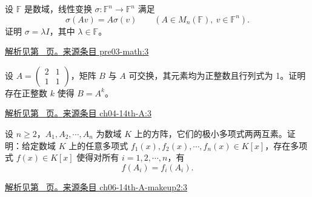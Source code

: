 \documentclass[12pt,fontset=fandol]{ctexart}
\begin{document}
\begin{example}\label{ex:pre03-math:3}

设 $\mathbb F$ 是数域，线性变换 $\sigma:\mathbb F^n\to\mathbb F^n$ 满足
\[
\sigma(Av)=A\sigma(v)
\qquad(A\in M_n(\mathbb F),\ v\in\mathbb F^n).
\]
证明 $\sigma=\lambda I$，其中 $\lambda\in\mathbb F$。

\par\hyperref[ans:pre03-math:3]{解析见第~\pageref{ans:pre03-math:3} 页。}\quad\href{https://github.com/lzxcr/cmc-mathematics/blob/64916fa1fdbc3e444a652eca204d5669058ee321/src/problems/preliminary/03/03.md}{来源条目 pre03-math:3}

\end{example}

\begin{example}\label{ex:ch04-14th-A:3}

设 $A=\begin{pmatrix}2&1\\1&1\end{pmatrix}$，矩阵 $B$ 与 $A$ 可交换，其元素均为正整数且行列式为 1。证明存在正整数 $k$ 使得 $B=A^{k}$。

\par\hyperref[ans:ch04-14th-A:3]{解析见第~\pageref{ans:ch04-14th-A:3} 页。}\quad\href{https://github.com/lzxcr/cmc-mathematics/blob/64916fa1fdbc3e444a652eca204d5669058ee321/src/problems/preliminary/14/03.md}{来源条目 ch04-14th-A:3}

\end{example}

\begin{example}\label{ex:ch06-14th-A-makeup2:3}

设 $n\geq 2$，$A_{1},A_{2},\cdots,A_{n}$ 为数域 $K$ 上的方阵，它们的极小多项式两两互素。证明：给定数域 $K$ 上的任意多项式 $f_{1}(x),f_{2}(x),\cdots,f_{n}(x)\in K[x]$，存在多项式 $f(x)\in K[x]$ 使得对所有 $i=1,2,\cdots,n$，有
\[
f\left(A_{i}\right)=f_{i}\left(A_{i}\right).
\]

\par\hyperref[ans:ch06-14th-A-makeup2:3]{解析见第~\pageref{ans:ch06-14th-A-makeup2:3} 页。}\quad\href{https://github.com/lzxcr/cmc-mathematics/blob/64916fa1fdbc3e444a652eca204d5669058ee321/src/problems/preliminary/14-makeup2/03.md}{来源条目 ch06-14th-A-makeup2:3}

\end{example}
\end{document}
